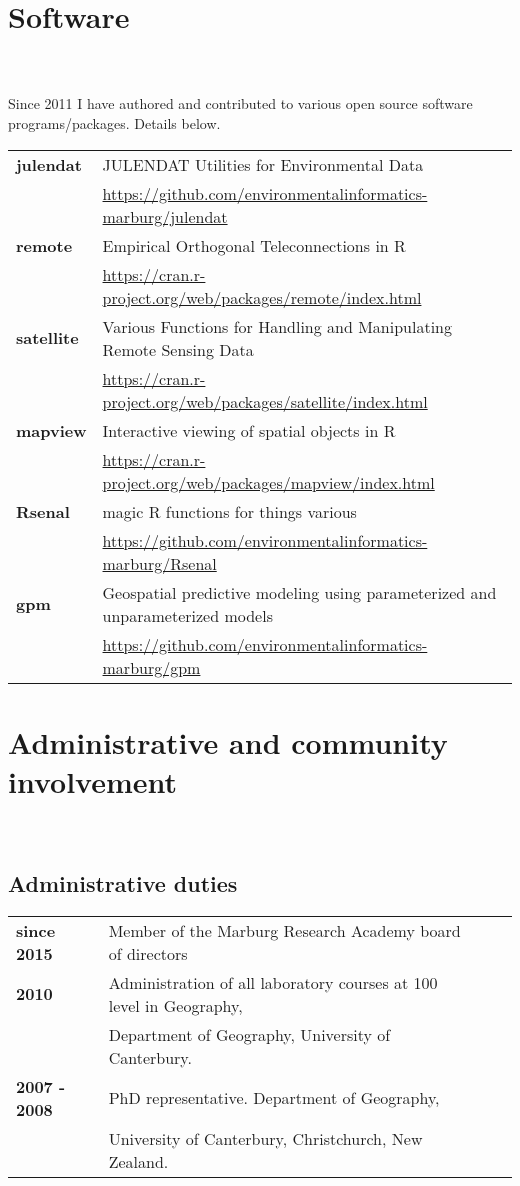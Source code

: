 \documentclass[a4paper,11pt]{article}
\begin{document}
\section{Software}
\hrulefill \\
\hfill \\
Since 2011 I have authored and contributed to various open source software programs/packages. Details below.
\linebreak{}
\linebreak{}
\begin{tabular}{ll}
\textbf{julendat} & JULENDAT Utilities for Environmental Data\\
				  & \url{https://github.com/environmentalinformatics-marburg/julendat}\\
\textbf{remote} 	  & Empirical Orthogonal Teleconnections in R\\
				  & \url{https://cran.r-project.org/web/packages/remote/index.html}\\
\textbf{satellite} & Various Functions for Handling and Manipulating Remote Sensing Data\\
				  & \url{https://cran.r-project.org/web/packages/satellite/index.html}\\
\textbf{mapview} & Interactive viewing of spatial objects in R\\
				  & \url{https://cran.r-project.org/web/packages/mapview/index.html}\\
\textbf{Rsenal}  & magic R functions for things various\\
				 & \url{https://github.com/environmentalinformatics-marburg/Rsenal}\\
\textbf{gpm}  & Geospatial predictive modeling using parameterized and unparameterized models\\
				 & \url{https://github.com/environmentalinformatics-marburg/gpm}\\
\end{tabular}
\linebreak{}

\section{Administrative and community involvement}
\hrulefill \\
\subsection{Administrative duties}
\begin{tabular}{llll} \\
\textbf{since 2015} & Member of the Marburg Research Academy board of directors\\
\textbf{2010} & Administration of all laboratory courses at 100 level in Geography,\\
			  & Department of Geography, University of Canterbury.\\
\textbf{2007 - 2008} & PhD representative. Department of Geography,\\
			  & University of Canterbury, Christchurch, New Zealand.
\end{tabular}
\linebreak{}
\end{document}
